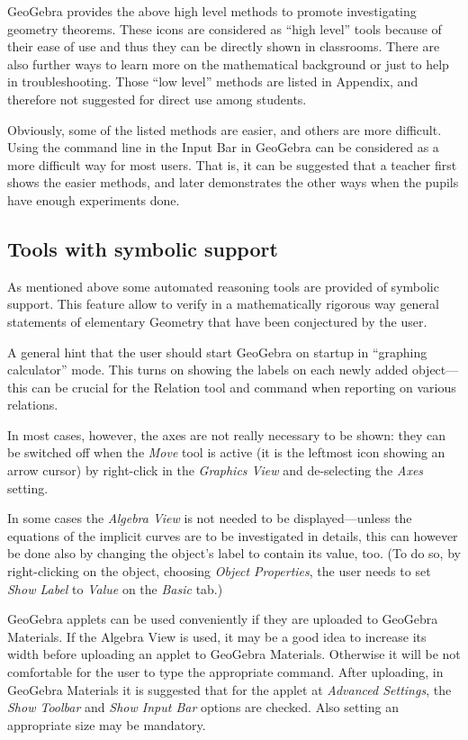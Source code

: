 \documentclass{article}
\begin{document}
GeoGebra provides the above high level methods to promote investigating geometry theorems. These icons are considered as ``high level'' tools because of their ease of use and thus they can be directly shown in classrooms. There are also further ways to learn more on the mathematical background or just to help in troubleshooting. Those ``low level'' methods are listed in Appendix, and therefore not suggested for direct use among students.

Obviously, some of the listed methods are easier, and others are more difficult. Using the command line in the Input Bar in GeoGebra can be considered as a more difficult way for most users. That is, it can be suggested that a teacher first shows the easier methods, and later demonstrates the other ways when the pupils have enough experiments done.

\subsection{Tools with symbolic support}

As mentioned above some automated reasoning tools are provided of symbolic support. This feature allow  to verify in a mathematically rigorous way general statements of elementary Geometry that have been conjectured by the user.

A general hint that the user should start GeoGebra on startup in ``graphing calculator'' mode. This turns on showing the labels on each newly added object---this can be crucial for the Relation tool and command when reporting on various relations. 

In most cases, however, the axes are not really necessary to be shown: they can be switched off when the \textit{Move} tool is active (it is the leftmost icon showing an arrow cursor) by right-click in the \textit{Graphics View} and de-selecting the \textit{Axes} setting.

In some cases the \textit{Algebra View} is not needed to be displayed---unless the equations of the implicit curves are to be investigated in details, this can however be done also by changing the object's label to contain its value, too. (To do so, by right-clicking on the object, choosing \textit{Object Properties}, the user needs to set \textit{Show Label} to \textit{Value} on the \textit{Basic} tab.)

GeoGebra applets can be used conveniently if they are uploaded to GeoGebra Materials.
If the Algebra View is used, it may be a good idea to increase its width before uploading an applet to GeoGebra Materials. Otherwise it will be not comfortable for the user to type the appropriate command. After uploading, in GeoGebra Materials it is suggested that for the applet at \textit{Advanced Settings}, the \textit{Show Toolbar} and \textit{Show Input Bar} options are checked. Also setting an appropriate size may be mandatory.
\end{document}
